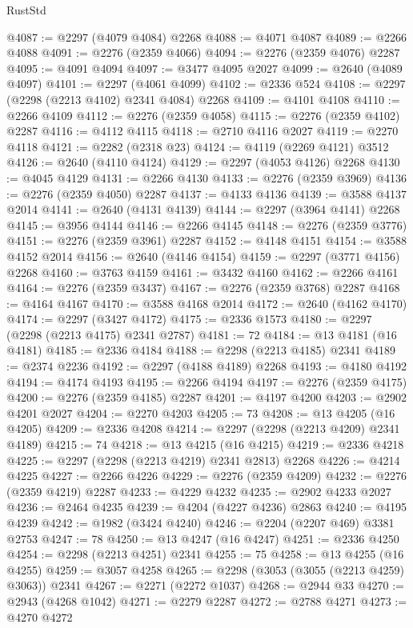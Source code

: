 \begin{lexlean}{RustStd}
\begin{coremodule}
{\begin{coremodule}
{{{{{{{{{{{{{{{{{{{{{{{{{{{{{{{{{{{{{{{{{{{{{{{{{{{{{{@4087 := @2297 (@4079 @4084) @2268
@4088 := @4071 @4087
@4089 := @2266 @4088
@4091 := @2276 (@2359 @4066)
@4094 := @2276 (@2359 @4076) @2287
@4095 := @4091 @4094
@4097 := @3477 @4095 @2027
@4099 := @2640 (@4089 @4097)
@4101 := @2297 (@4061 @4099)
@4102 := @2336 @524
@4108 := @2297 (@2298 (@2213 @4102) @2341 @4084) @2268
@4109 := @4101 @4108
@4110 := @2266 @4109
@4112 := @2276 (@2359 @4058)
@4115 := @2276 (@2359 @4102) @2287
@4116 := @4112 @4115
@4118 := @2710 @4116 @2027
@4119 := @2270 @4118
@4121 := @2282 (@2318 @23)
@4124 := @4119 (@2269 @4121) @3512
@4126 := @2640 (@4110 @4124)
@4129 := @2297 (@4053 @4126) @2268
@4130 := @4045 @4129
@4131 := @2266 @4130
@4133 := @2276 (@2359 @3969)
@4136 := @2276 (@2359 @4050) @2287
@4137 := @4133 @4136
@4139 := @3588 @4137 @2014
@4141 := @2640 (@4131 @4139)
@4144 := @2297 (@3964 @4141) @2268
@4145 := @3956 @4144
@4146 := @2266 @4145
@4148 := @2276 (@2359 @3776)
@4151 := @2276 (@2359 @3961) @2287
@4152 := @4148 @4151
@4154 := @3588 @4152 @2014
@4156 := @2640 (@4146 @4154)
@4159 := @2297 (@3771 @4156) @2268
@4160 := @3763 @4159
@4161 := @3432 @4160
@4162 := @2266 @4161
@4164 := @2276 (@2359 @3437)
@4167 := @2276 (@2359 @3768) @2287
@4168 := @4164 @4167
@4170 := @3588 @4168 @2014
@4172 := @2640 (@4162 @4170)
@4174 := @2297 (@3427 @4172)
@4175 := @2336 @1573
@4180 := @2297 (@2298 (@2213 @4175) @2341 @2787)
@4181 := 72
@4184 := @13 @4181 (@16 @4181)
@4185 := @2336 @4184
@4188 := @2298 (@2213 @4185) @2341
@4189 := @2374 @2236
@4192 := @2297 (@4188 @4189) @2268
@4193 := @4180 @4192
@4194 := @4174 @4193
@4195 := @2266 @4194
@4197 := @2276 (@2359 @4175)
@4200 := @2276 (@2359 @4185) @2287
@4201 := @4197 @4200
@4203 := @2902 @4201 @2027
@4204 := @2270 @4203
@4205 := 73
@4208 := @13 @4205 (@16 @4205)
@4209 := @2336 @4208
@4214 := @2297 (@2298 (@2213 @4209) @2341 @4189)
@4215 := 74
@4218 := @13 @4215 (@16 @4215)
@4219 := @2336 @4218
@4225 := @2297 (@2298 (@2213 @4219) @2341 @2813) @2268
@4226 := @4214 @4225
@4227 := @2266 @4226
@4229 := @2276 (@2359 @4209)
@4232 := @2276 (@2359 @4219) @2287
@4233 := @4229 @4232
@4235 := @2902 @4233 @2027
@4236 := @2464 @4235
@4239 := @4204 (@4227 @4236) @2863
@4240 := @4195 @4239
@4242 := @1982 (@3424 @4240)
@4246 := @2204 (@2207 @469) @3381 @2753
@4247 := 78
@4250 := @13 @4247 (@16 @4247)
@4251 := @2336 @4250
@4254 := @2298 (@2213 @4251) @2341
@4255 := 75
@4258 := @13 @4255 (@16 @4255)
@4259 := @3057 @4258
@4265 := @2298 (@3053 (@3055 (@2213 @4259) @3063)) @2341
@4267 := @2271 (@2272 @1037)
@4268 := @2944 @33
@4270 := @2943 (@4268 @1042)
@4271 := @2279 @2287
@4272 := @2788 @4271
@4273 := @4270 @4272
}}}}}}}}}}}}}}}}}}}}}}}}}}}}}}}}}}}}}}}}}}}}}}}}}}}}}}
\end{coremodule}}
\end{coremodule}
\end{lexlean}
